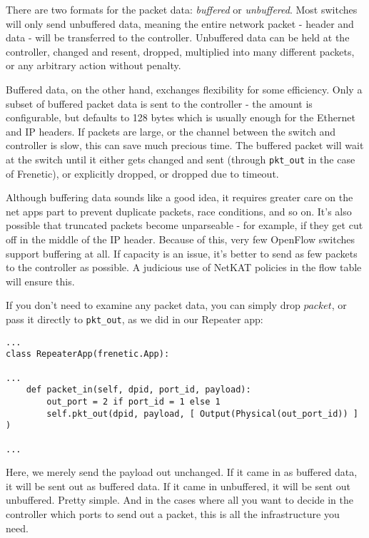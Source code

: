 \bigskip
There are two formats for the packet data: \emph{buffered} or \emph{unbuffered}.
Most switches will only send unbuffered data, meaning the entire network packet - header and data - will be 
transferred to the controller.
Unbuffered data can be held at the controller, changed and resent, dropped, multiplied into many different packets, or 
any arbitrary action without penalty.  

Buffered data, on the other hand, exchanges flexibility for some efficiency.
Only a subset of buffered packet data is sent to the controller - the amount is configurable, but defaults to 128 bytes which is usually enough for the Ethernet and IP headers.  
If packets are large, or the channel between the switch and controller is slow, this can save much precious time.
The buffered packet will wait at the switch until it either gets changed and sent (through \texttt{pkt\_out} in 
the case of Frenetic), or explicitly dropped, or dropped due to timeout.  

Although buffering data sounds like a good idea, it requires greater care on the net apps part to prevent
duplicate packets, race conditions, and so on.
It's also possible that truncated packets become unparseable - for example, if they get cut off in the middle of
the IP header.
Because of this, very few OpenFlow switches support buffering at all.  
If capacity is an issue, it's better to send as few packets to the controller as possible.
A judicious use of NetKAT policies in the flow table will ensure this.  

If you don't need to examine any packet data, you can simply drop $packet$, or pass it directly to \texttt{pkt\_out},
as we did in our Repeater app:

\begin{verbatim}
...
class RepeaterApp(frenetic.App):

...
    def packet_in(self, dpid, port_id, payload):
        out_port = 2 if port_id = 1 else 1
        self.pkt_out(dpid, payload, [ Output(Physical(out_port_id)) ] )

...
\end{verbatim}

Here, we merely send the payload out unchanged.  
If it came in as buffered data, it will be sent out as buffered data.
If it came in unbuffered, it will be sent out unbuffered.  
Pretty simple.
And in the cases where all you want to decide in the controller which ports to send out a packet, this
is all the infrastructure you need.

